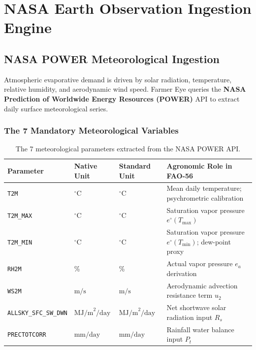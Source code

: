 \documentclass[11pt,a4paper,oneside]{report}
\begin{document}
\chapter{NASA Earth Observation Ingestion Engine}

\section{NASA POWER Meteorological Ingestion}
Atmospheric evaporative demand is driven by solar radiation, temperature, relative humidity, and aerodynamic wind speed. Farmer Eye queries the \textbf{NASA Prediction of Worldwide Energy Resources (POWER)} API to extract daily surface meteorological series.

\subsection{The 7 Mandatory Meteorological Variables}
\begin{table}[h!]
\centering
\small
\begin{tabularx}{\linewidth}{lllX}
\toprule
\textbf{Parameter} & \textbf{Native Unit} & \textbf{Standard Unit} & \textbf{Agronomic Role in FAO-56} \\
\midrule
\texttt{T2M} & $^\circ\text{C}$ & $^\circ\text{C}$ & Mean daily temperature; psychrometric calibration \\
\texttt{T2M\_MAX} & $^\circ\text{C}$ & $^\circ\text{C}$ & Saturation vapor pressure $e^\circ(T_{\max})$ \\
\texttt{T2M\_MIN} & $^\circ\text{C}$ & $^\circ\text{C}$ & Saturation vapor pressure $e^\circ(T_{\min})$; dew-point proxy \\
\texttt{RH2M} & \% & \% & Actual vapor pressure $e_a$ derivation \\
\texttt{WS2M} & $\text{m/s}$ & $\text{m/s}$ & Aerodynamic advection resistance term $u_2$ \\
\texttt{ALLSKY\_SFC\_SW\_DWN} & $\text{MJ/m}^2/\text{day}$ & $\text{MJ/m}^2/\text{day}$ & Net shortwave solar radiation input $R_s$ \\
\texttt{PRECTOTCORR} & $\text{mm/day}$ & $\text{mm/day}$ & Rainfall water balance input $P_t$ \\
\bottomrule
\end{tabularx}
\caption{The 7 meteorological parameters extracted from the NASA POWER API.}
\end{table}
\end{document}
